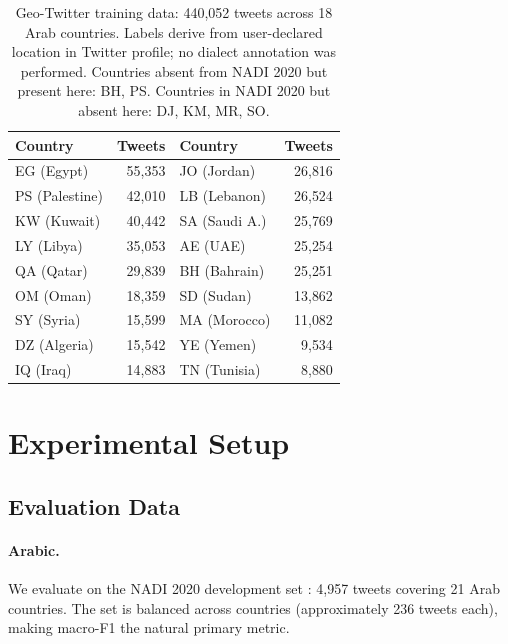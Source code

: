 \documentclass[11pt]{article}
\begin{document}
\begin{table}[t]
\centering
\small
\begin{tabular}{lrlr}
\toprule
Country & Tweets & Country & Tweets \\
\midrule
EG (Egypt)       & 55{,}353 & JO (Jordan)   & 26{,}816 \\
PS (Palestine)   & 42{,}010 & LB (Lebanon)  & 26{,}524 \\
KW (Kuwait)      & 40{,}442 & SA (Saudi A.) & 25{,}769 \\
LY (Libya)       & 35{,}053 & AE (UAE)      & 25{,}254 \\
QA (Qatar)       & 29{,}839 & BH (Bahrain)  & 25{,}251 \\
OM (Oman)        & 18{,}359 & SD (Sudan)    & 13{,}862 \\
SY (Syria)       & 15{,}599 & MA (Morocco)  & 11{,}082 \\
DZ (Algeria)     & 15{,}542 & YE (Yemen)    &  9{,}534 \\
IQ (Iraq)        & 14{,}883 & TN (Tunisia)  &  8{,}880 \\
\bottomrule
\end{tabular}
\caption{Geo-Twitter training data: 440{,}052 tweets across 18 Arab
countries. Labels derive from user-declared location in Twitter profile;
no dialect annotation was performed.
Countries absent from NADI 2020 but present here: BH, PS.
Countries in NADI 2020 but absent here: DJ, KM, MR, SO.}
\label{tab:twitter-stats}
\end{table}

\section{Experimental Setup}
\label{sec:setup}

\subsection{Evaluation Data}

\paragraph{Arabic.} We evaluate on the NADI 2020 development set
\cite{abdul-mageed-etal-2020-nadi}: 4{,}957 tweets covering 21 Arab countries.
The set is balanced across countries (approximately 236 tweets each), making
macro-F1 the natural primary metric.
\end{document}
